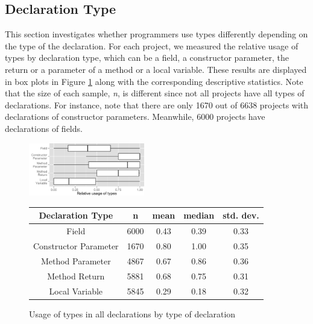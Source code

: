 \documentclass[preprint]{sigplanconf}
\renewcommand{\arraystretch}{1.2}
\begin{document}
\subsection{Declaration Type\label{sec:results-type}}
This section investigates whether programmers use types differently depending on the type of the declaration.
For each project, we measured the relative usage of types by declaration type, which can be a field, a constructor parameter, the return or a parameter of a method or a local variable.
These results are displayed in box plots in Figure \ref{fig:all_boxplot_type} along with the corresponding descriptive statistics.
Note that the size of each sample, \emph{n}, is different since not all projects have all types of declarations. 
For instance, note that there are only 1670 out of 6638 projects with declarations of constructor parameters.
Meanwhile, 6000 projects have declarations of fields.

\begin{figure}[h]
\centering 
\includegraphics[width=0.45\textwidth]{../analysis/result/all/boxplots/6_declarations_by_type.png} 
\vspace{0.3cm}

\renewcommand{\arraystretch}{1.2}
\small
\begin{tabular}{|c|c|c|c|c|}
\hline
Declaration Type		& n		& mean	& median		& std. dev.	\\
\hline
\hline
Field					& 6000	& 0.43	& 0.39		& 0.33		\\ \hline
Constructor Parameter	& 1670	& 0.80	& 1.00		& 0.35		\\ \hline
Method Parameter		& 4867	& 0.67	& 0.86		& 0.36		\\ \hline
Method Return			& 5881	& 0.68	& 0.75		& 0.31		\\ \hline
Local Variable			& 5845	& 0.29	& 0.18		& 0.32		\\ \hline
\end{tabular}

\caption{Usage of types in all declarations by type of declaration}
\label{fig:all_boxplot_type} 
\end{figure}


\end{document}
